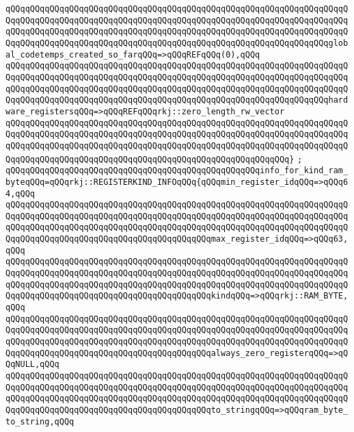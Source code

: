 \verb|qQQqqQQqqQQqqQQqqQQqqQQqqQQqqQQqqQQqqQQqqQQqqQQqqQQqqQQqqQQqqQQqqQQqqQQqqQQqqQQqqQQqqQQqqQQqqQQqqQQqqQQqqQQqqQQqqQQqqQQqqQQqqQQqqQQqqQQqqQQqqQQqqQQqqQQqqQQqqQQqqQQqqQQqqQQqqQQqqQQqqQQqqQQqqQQqqQQqqQQqqQQqqQQqqQQqqQQqqQQqqQQqqQQqqQQqqQQqqQQqqQQqqQQqqQQqqQQqqQQqqQQqqQQqqQQqqQQqglobal_codetemps_created_so_farqQQq=>qQQqREFqQQq(0),qQQq|\newline
\verb|qQQqqQQqqQQqqQQqqQQqqQQqqQQqqQQqqQQqqQQqqQQqqQQqqQQqqQQqqQQqqQQqqQQqqQQqqQQqqQQqqQQqqQQqqQQqqQQqqQQqqQQqqQQqqQQqqQQqqQQqqQQqqQQqqQQqqQQqqQQqqQQqqQQqqQQqqQQqqQQqqQQqqQQqqQQqqQQqqQQqqQQqqQQqqQQqqQQqqQQqqQQqqQQqqQQqqQQqqQQqqQQqqQQqqQQqqQQqqQQqqQQqqQQqqQQqqQQqqQQqqQQqqQQqqQQqqQQqhardware_registersqQQq=>qQQqREFqQQqrkj::zero_length_rw_vector|\newline
\verb|qQQqqQQqqQQqqQQqqQQqqQQqqQQqqQQqqQQqqQQqqQQqqQQqqQQqqQQqqQQqqQQqqQQqqQQqqQQqqQQqqQQqqQQqqQQqqQQqqQQqqQQqqQQqqQQqqQQqqQQqqQQqqQQqqQQqqQQqqQQqqQQqqQQqqQQqqQQqqQQqqQQqqQQqqQQqqQQqqQQqqQQqqQQqqQQqqQQqqQQqqQQqqQQqqQQqqQQqqQQqqQQqqQQqqQQqqQQqqQQqqQQqqQQqqQQqqQQqqQQqqQQqqQQq}|\newline
\verb|;|\newline
\verb|qQQqqQQqqQQqqQQqqQQqqQQqqQQqqQQqqQQqqQQqqQQqqQQqqQQqinfo_for_kind_ram_byteqQQq=qQQqrkj::REGISTERKIND_INFOqQQq{qQQqmin_register_idqQQq=>qQQq64,qQQq|\newline
\verb|qQQqqQQqqQQqqQQqqQQqqQQqqQQqqQQqqQQqqQQqqQQqqQQqqQQqqQQqqQQqqQQqqQQqqQQqqQQqqQQqqQQqqQQqqQQqqQQqqQQqqQQqqQQqqQQqqQQqqQQqqQQqqQQqqQQqqQQqqQQqqQQqqQQqqQQqqQQqqQQqqQQqqQQqqQQqqQQqqQQqqQQqqQQqqQQqqQQqqQQqqQQqqQQqqQQqqQQqqQQqqQQqqQQqqQQqqQQqqQQqqQQqqQQqqQQqmax_register_idqQQq=>qQQq63,qQQq|\newline
\verb|qQQqqQQqqQQqqQQqqQQqqQQqqQQqqQQqqQQqqQQqqQQqqQQqqQQqqQQqqQQqqQQqqQQqqQQqqQQqqQQqqQQqqQQqqQQqqQQqqQQqqQQqqQQqqQQqqQQqqQQqqQQqqQQqqQQqqQQqqQQqqQQqqQQqqQQqqQQqqQQqqQQqqQQqqQQqqQQqqQQqqQQqqQQqqQQqqQQqqQQqqQQqqQQqqQQqqQQqqQQqqQQqqQQqqQQqqQQqqQQqqQQqqQQqqQQqkindqQQq=>qQQqrkj::RAM_BYTE,qQQq|\newline
\verb|qQQqqQQqqQQqqQQqqQQqqQQqqQQqqQQqqQQqqQQqqQQqqQQqqQQqqQQqqQQqqQQqqQQqqQQqqQQqqQQqqQQqqQQqqQQqqQQqqQQqqQQqqQQqqQQqqQQqqQQqqQQqqQQqqQQqqQQqqQQqqQQqqQQqqQQqqQQqqQQqqQQqqQQqqQQqqQQqqQQqqQQqqQQqqQQqqQQqqQQqqQQqqQQqqQQqqQQqqQQqqQQqqQQqqQQqqQQqqQQqqQQqqQQqqQQqalways_zero_registerqQQq=>qQQqNULL,qQQq|\newline
\verb|qQQqqQQqqQQqqQQqqQQqqQQqqQQqqQQqqQQqqQQqqQQqqQQqqQQqqQQqqQQqqQQqqQQqqQQqqQQqqQQqqQQqqQQqqQQqqQQqqQQqqQQqqQQqqQQqqQQqqQQqqQQqqQQqqQQqqQQqqQQqqQQqqQQqqQQqqQQqqQQqqQQqqQQqqQQqqQQqqQQqqQQqqQQqqQQqqQQqqQQqqQQqqQQqqQQqqQQqqQQqqQQqqQQqqQQqqQQqqQQqqQQqqQQqqQQqto_stringqQQq=>qQQqram_byte_to_string,qQQq|\newline
